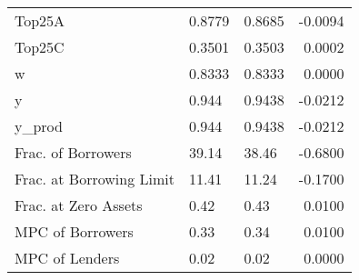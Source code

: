 \begin{table}
\begin{tabular}{lllr}
                  Top25A &  0.8779 &   0.8685 & -0.0094 \\
                  Top25C &  0.3501 &   0.3503 &  0.0002 \\
                       w &  0.8333 &   0.8333 &  0.0000 \\
                       y &   0.944 &   0.9438 & -0.0212 \\
                  y\_prod &   0.944 &   0.9438 & -0.0212 \\
      Frac. of Borrowers &   39.14 &    38.46 & -0.6800 \\
Frac. at Borrowing Limit &   11.41 &    11.24 & -0.1700 \\
    Frac. at Zero Assets &    0.42 &     0.43 &  0.0100 \\
        MPC of Borrowers &    0.33 &     0.34 &  0.0100 \\
          MPC of Lenders &    0.02 &     0.02 &  0.0000 \\
\bottomrule
\end{tabular}
\end{table}
